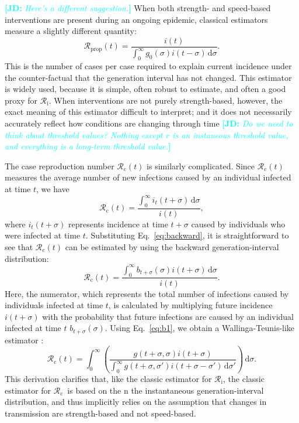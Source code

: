 \documentclass[12pt]{article}
\newcommand{\comment}{\showcomment}
\newcommand{\showcomment}[3]{\textcolor{#1}{\textbf{[#2: }\textsl{#3}\textbf{]}}}
\newcommand{\jd}[1]{\comment{cyan}{JD}{#1}}
\newcommand{\eref}[1]{Eq.~\ref{eq:#1}}
\newcommand{\Rx}[1]{\ensuremath{{\mathcal R}_{#1}}\xspace}
\newcommand{\Rc}{\Rx{\mathrm{c}}}
\newcommand{\Ri}{\Rx{\mathrm{i}}}
\newcommand{\Rprop}{\Rx{\mathrm{prop}}}
\newcommand{\dd}[1]{\ensuremath{\, \mathrm{d}#1}}
\newcommand{\dsigma}{\dd{\sigma}}
\begin{document}
\jd{Here's a different suggestion.}
When both strength- and speed-based interventions are present during an ongoing epidemic, classical estimators \cite{fraser2007estimating,cori2013new}  measure a slightly different quantity:
\begin{equation}
\Rprop(t) = \frac{i(t)}{\int_0^\infty g_0(\sigma) i(t-\sigma) \dsigma}.
\end{equation}
This is the number of cases per case required to explain current incidence under the counter-factual that the generation interval has not changed.
This estimator is widely used, because it is simple, often robust to estimate, and often a good proxy for \Ri.
When interventions are not purely strength-based, however, the exact meaning of this estimator difficult to interpret; and it does not necessarily accurately reflect how conditions are changing through time \jd{Do we need to think about threshold values? Nothing except $r$ is an instaneous threshold value, and everything is a long-term threshold value.}

The case reproduction number $\Rc(t)$ is similarly complicated. 
Since $\Rc(t)$ measures the average number of new infections caused by an individual infected at time $t$, we have
\begin{equation}
\Rc(t) = \frac{\int_0^\infty i_t(t+\sigma) \dsigma}{i(t)},
\end{equation}
where $i_t(t+\sigma)$ represents incidence at time $t+\sigma$ caused by individuals who were infected at time $t$.
Substituting \eref{backward}, it is straightforward to see that $\Rc(t)$ can be estimated by using the backward generation-interval distribution:
\begin{equation}
\Rc(t) = \frac{\int_0^\infty b_{t+\sigma}(\sigma) i(t+\sigma) \dsigma}{i(t)}.
\end{equation}
Here, the numerator, which represents the total number of infections caused by individuals infected at time $t$, is calculated by multiplying future incidence $i(t+\sigma)$ with the probability that future infections are caused by an individual infected at time $t$ $b_{t+\sigma}(\sigma)$.
Using \eref{b1}, we obtain a Wallinga-Teunis-like estimator \citep{wallinga2004different}:
\begin{equation}
\Rc(t) = \int_0^\infty \left(\frac{g(t+\sigma,\sigma) i(t+\sigma)}{\int_0^\infty g(t+\sigma,\sigma') i(t+\sigma-\sigma') \dsigma'} \right) \dsigma.
\label{eq:wtlike}
\end{equation}
This derivation clarifies that, like the classic estimator for \Ri, the classic estimator for \Rc\ is based on the n the instantaneous generation-interval distribution, and thus implicitly relies on the assumption that changes in transmission are strength-based and not speed-based.
\end{document}
